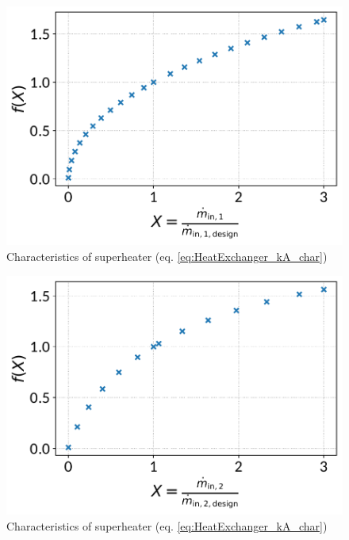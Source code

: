 \begin{minipage}{0.5\textwidth}
\begin{figure}[H]\begin{center}
\includegraphics[width=\textwidth]{figures/HeatExchanger_CharLine_kA_char1_superheater.pdf}
\caption{Characteristics of superheater (eq. \ref{eq:HeatExchanger_kA_char})}
\label{fig:CharLine_kA_char1_superheater}
\end{center}\end{figure}

\end{minipage}
\begin{minipage}{0.5\textwidth}
\begin{figure}[H]\begin{center}
\includegraphics[width=\textwidth]{figures/HeatExchanger_CharLine_kA_char2_superheater.pdf}
\caption{Characteristics of superheater (eq. \ref{eq:HeatExchanger_kA_char})}
\label{fig:CharLine_kA_char2_superheater}
\end{center}\end{figure}

\end{minipage}

